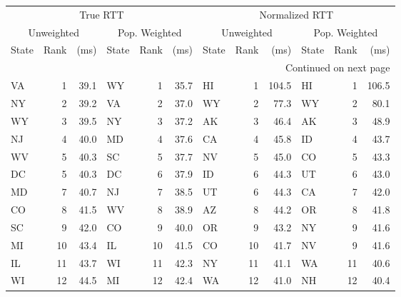 \begin{longtable}{lrr|lrr||lrr|lrr}
\toprule
  \multicolumn{6}{c||}{True RTT} & \multicolumn{6}{c}{Normalized RTT} \\
\multicolumn{3}{c|}{Unweighted} & \multicolumn{3}{c||}{Pop. Weighted} & \multicolumn{3}{c|}{Unweighted} & \multicolumn{3}{c}{Pop. Weighted} \\
     State & Rank & (ms) &         State & Rank &  (ms) &          State & Rank &  (ms) &         State & Rank &  (ms) \\
\midrule
\endhead
\midrule
\multicolumn{12}{r}{{Continued on next page}} \\
\midrule
\endfoot
\bottomrule
\endlastfoot
        VA &    1 &   39.1 &            WY &    1 &  35.7 &             HI &    1 &  104.5 &            HI &    1 &  106.5 \\
        NY &    2 &   39.2 &            VA &    2 &  37.0 &             WY &    2 &   77.3 &            WY &    2 &   80.1 \\
        WY &    3 &   39.5 &            NY &    3 &  37.2 &             AK &    3 &   46.4 &            AK &    3 &   48.9 \\
        NJ &    4 &   40.0 &            MD &    4 &  37.6 &             CA &    4 &   45.8 &            ID &    4 &   43.7 \\
        WV &    5 &   40.3 &            SC &    5 &  37.7 &             NV &    5 &   45.0 &            CO &    5 &   43.3 \\
        DC &    5 &   40.3 &            DC &    6 &  37.9 &             ID &    6 &   44.3 &            UT &    6 &   43.0 \\
        MD &    7 &   40.7 &            NJ &    7 &  38.5 &             UT &    6 &   44.3 &            CA &    7 &   42.0 \\
        CO &    8 &   41.5 &            WV &    8 &  38.9 &             AZ &    8 &   44.2 &            OR &    8 &   41.8 \\
        SC &    9 &   42.0 &            CO &    9 &  40.0 &             OR &    9 &   43.2 &            NY &    9 &   41.6 \\
        MI &   10 &   43.4 &            IL &   10 &  41.5 &             CO &   10 &   41.7 &            NV &    9 &   41.6 \\
        IL &   11 &   43.7 &            WI &   11 &  42.3 &             NY &   11 &   41.1 &            WA &   11 &   40.6 \\
        WI &   12 &   44.5 &            MI &   12 &  42.4 &             WA &   12 &   41.0 &            NH &   12 &   40.4 \\

\end{longtable}
